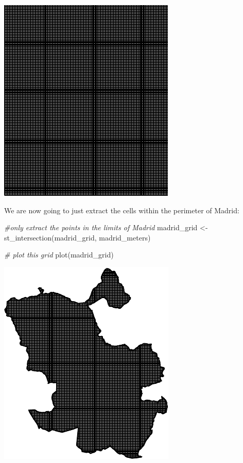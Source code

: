 \documentclass[
]{book}
\makeatletter
\newenvironment{Shaded}{\begin{snugshade}}{\end{snugshade}}
\newcommand{\CommentTok}[1]{\textcolor[rgb]{0.37,0.37,0.37}{\textit{#1}}}
\newcommand{\FunctionTok}[1]{\textcolor[rgb]{0,0,0}{#1}}
\newcommand{\NormalTok}[1]{#1}
\newcommand{\OtherTok}[1]{\textcolor[rgb]{0.37,0.37,0.37}{#1}}
\newenvironment{kframe}{%
\medskip{}
\setlength{\fboxsep}{.8em}
 \def\at@end@of@kframe{}%
 \ifinner\ifhmode%
  \def\at@end@of@kframe{\end{minipage}}%
  \begin{minipage}{\columnwidth}%
 \fi\fi%
 \def\FrameCommand##1{\hskip\@totalleftmargin \hskip-\fboxsep
 \colorbox{shadecolor}{##1}\hskip-\fboxsep
     \hskip-\linewidth \hskip-\@totalleftmargin \hskip\columnwidth}%
 \MakeFramed {\advance\hsize-\width
   \@totalleftmargin\z@ \linewidth\hsize
   \@setminipage}}%
 {\par\unskip\endMakeFramed%
 \at@end@of@kframe}
\renewenvironment{Shaded}{\begin{kframe}}{\end{kframe}}
\makeatother
\begin{document}
\includegraphics{crime_mapping_files/figure-latex/unnamed-chunk-68-1.pdf}

We are now going to just extract the cells within the perimeter of Madrid:

\begin{Shaded}
\begin{Highlighting}[]
\CommentTok{\#only extract the points in the limits of Madrid}
\NormalTok{madrid\_grid }\OtherTok{\textless{}{-}} \FunctionTok{st\_intersection}\NormalTok{(madrid\_grid, madrid\_meters)   }

\CommentTok{\# plot this grid}
\FunctionTok{plot}\NormalTok{(madrid\_grid)}
\end{Highlighting}
\end{Shaded}

\includegraphics{crime_mapping_files/figure-latex/unnamed-chunk-69-1.pdf}
\end{document}
